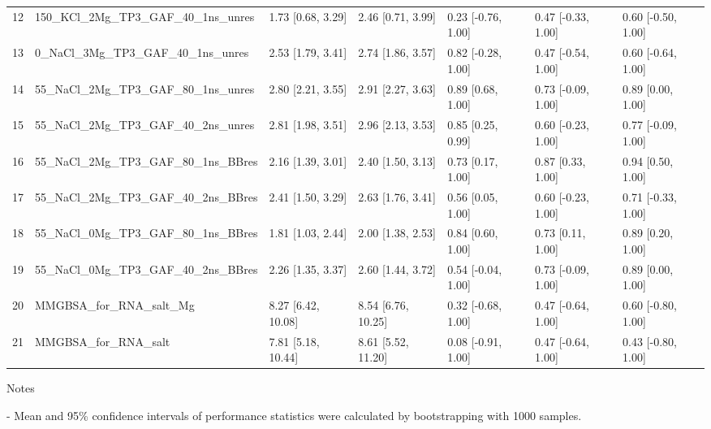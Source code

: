 \documentclass{article}
\begin{document}
\begin{center}
\begin{longtable}{|p{1cm}|p{5cm}|p{2.5cm}|p{2.5cm}|p{2.5cm}|p{2.5cm}|p{2.5cm}|}
12 & 150\_KCl\_2Mg\_TP3\_GAF\_40\_1ns\_unres & 1.73 [0.68, 3.29] & 2.46 [0.71, 3.99] & 0.23 [-0.76, 1.00] & 0.47 [-0.33, 1.00] & 0.60 [-0.50, 1.00] \\
13 & 0\_NaCl\_3Mg\_TP3\_GAF\_40\_1ns\_unres & 2.53 [1.79, 3.41] & 2.74 [1.86, 3.57] & 0.82 [-0.28, 1.00] & 0.47 [-0.54, 1.00] & 0.60 [-0.64, 1.00] \\
14 & 55\_NaCl\_2Mg\_TP3\_GAF\_80\_1ns\_unres & 2.80 [2.21, 3.55] & 2.91 [2.27, 3.63] & 0.89 [0.68, 1.00] & 0.73 [-0.09, 1.00] & 0.89 [0.00, 1.00] \\
15 & 55\_NaCl\_2Mg\_TP3\_GAF\_40\_2ns\_unres & 2.81 [1.98, 3.51] & 2.96 [2.13, 3.53] & 0.85 [0.25, 0.99] & 0.60 [-0.23, 1.00] & 0.77 [-0.09, 1.00] \\
16 & 55\_NaCl\_2Mg\_TP3\_GAF\_80\_1ns\_BBres & 2.16 [1.39, 3.01] & 2.40 [1.50, 3.13] & 0.73 [0.17, 1.00] & 0.87 [0.33, 1.00] & 0.94 [0.50, 1.00] \\
17 & 55\_NaCl\_2Mg\_TP3\_GAF\_40\_2ns\_BBres & 2.41 [1.50, 3.29] & 2.63 [1.76, 3.41] & 0.56 [0.05, 1.00] & 0.60 [-0.23, 1.00] & 0.71 [-0.33, 1.00] \\
18 & 55\_NaCl\_0Mg\_TP3\_GAF\_80\_1ns\_BBres & 1.81 [1.03, 2.44] & 2.00 [1.38, 2.53] & 0.84 [0.60, 1.00] & 0.73 [0.11, 1.00] & 0.89 [0.20, 1.00] \\
19 & 55\_NaCl\_0Mg\_TP3\_GAF\_40\_2ns\_BBres & 2.26 [1.35, 3.37] & 2.60 [1.44, 3.72] & 0.54 [-0.04, 1.00] & 0.73 [-0.09, 1.00] & 0.89 [0.00, 1.00] \\
20 & MMGBSA\_for\_RNA\_salt\_Mg & 8.27 [6.42, 10.08] & 8.54 [6.76, 10.25] & 0.32 [-0.68, 1.00] & 0.47 [-0.64, 1.00] & 0.60 [-0.80, 1.00] \\
21 & MMGBSA\_for\_RNA\_salt & 7.81 [5.18, 10.44] & 8.61 [5.52, 11.20] & 0.08 [-0.91, 1.00] & 0.47 [-0.64, 1.00] & 0.43 [-0.80, 1.00] \\
\end{longtable}
\end{center}

Notes

- Mean and 95\% confidence intervals of performance statistics were calculated by bootstrapping with 1000 samples.
\end{document}
